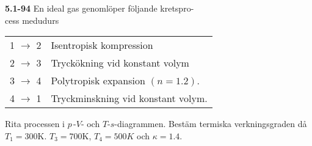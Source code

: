 \documentclass[./exercises.tex]{subfiles}
\begin{document}
\bigskip
\noindent\textbf{5.1-94}\hfill\break
\noindent En ideal gas genomlöper följande kretspro-\\
cess medudurs
\begin{table}[ht]
\noindent\begin{tabular}{ l l  } 
1 $\rightarrow$ 2 & Isentropisk kompression\\
2 $\rightarrow$ 3 & Tryckökning vid konstant volym  \\ 
3 $\rightarrow$ 4 & Polytropisk expansion $(n=1.2)$.\\
4 $\rightarrow$ 1 & Tryckminskning vid konstant volym.\\                
\end{tabular}
\end{table}

Rita processen i $p$\,-$V$- och $T$-$s$-diagrammen.
Bestäm termiska verkningsgraden då $T_1=300$K. $T_3=700$K, $T_4=500K$ och $\kappa=1.4$.
\bigskip
\end{document}
